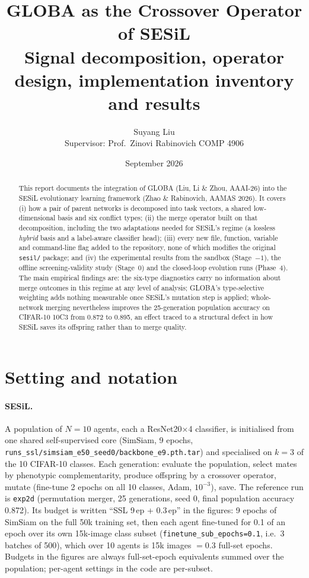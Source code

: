 \documentclass[11pt,a4paper]{article}
\title{GLOBA as the Crossover Operator of SESiL\\[0.4em]
\large Signal decomposition, operator design, implementation inventory and results}
\author{Suyang Liu\\ \small Supervisor: Prof.\ Zinovi Rabinovich \quad COMP 4906}
\date{September 2026}
\newcommand{\code}[1]{\texttt{#1}}
\begin{document}
\maketitle

\begin{abstract}
This report documents the integration of GLOBA (Liu, Li \& Zhou, AAAI-26) into the SESiL evolutionary learning framework (Zhao \& Rabinovich, AAMAS 2026). It covers (i) how a pair of parent networks is decomposed into task vectors, a shared low-dimensional basis and six conflict types; (ii) the merge operator built on that decomposition, including the two adaptations needed for SESiL's regime (a lossless \emph{hybrid} basis and a label-aware classifier head); (iii) every new file, function, variable and command-line flag added to the repository, none of which modifies the original \code{sesil/} package; and (iv) the experimental results from the sandbox (Stage~$-1$), the offline screening-validity study (Stage~0) and the closed-loop evolution runs (Phase~4). The main empirical findings are: the six-type diagnostics carry no information about merge outcomes in this regime at any level of analysis; GLOBA's type-selective weighting adds nothing measurable once SESiL's mutation step is applied; whole-network merging nevertheless improves the 25-generation population accuracy on CIFAR-10 10C3 from 0.872 to 0.895, an effect traced to a structural defect in how SESiL saves its offspring rather than to merge quality.
\end{abstract}

\tableofcontents
\newpage

\section{Setting and notation}

\paragraph{SESiL.} A population of $N=10$ agents, each a ResNet20$\times$4 classifier, is initialised from one shared self-supervised core (SimSiam, 9 epochs, \code{runs\_ssl/simsiam\_e50\_seed0/backbone\_e9.pth.tar}) and specialised on $k=3$ of the 10 CIFAR-10 classes. Each generation: evaluate the population, select mates by phenotypic complementarity, produce offspring by a crossover operator, mutate (fine-tune 2 epochs on all 10 classes, Adam, $10^{-3}$), save. The reference run is \code{exp2d} (permutation merger, 25 generations, seed 0, final population accuracy 0.872). Its budget is written ``SSL 9\,ep + 0.3\,ep'' in the figures: 9 epochs of SimSiam on the full 50k training set, then each agent fine-tuned for 0.1 of an epoch over its own 15k-image class subset (\code{finetune\_sub\_epochs=0.1}, i.e.\ 3 batches of 500), which over 10 agents is 15k images $=0.3$ full-set epochs. Budgets in the figures are always full-set-epoch equivalents summed over the population; per-agent settings in the code are per-subset.
\end{document}
